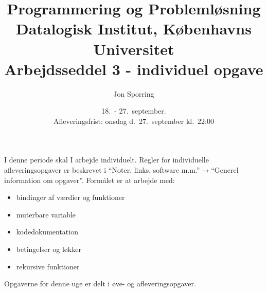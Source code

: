 \documentclass[a4paper,12pt]{article}
\title{Programmering og Problemløsning\\Datalogisk Institut,
  Københavns Universitet\\Arbejdsseddel 3 - individuel opgave}
\author{Jon Sporring}
\date{18.\ - 27.\ september.\\Afleveringsfrist: onsdag d.\ 27.\ september kl.\ 22:00}
\begin{document}
\maketitle

I denne periode skal I arbejde individuelt. Regler for individuelle afleveringsopgaver er beskrevet i "`Noter, links, software m.m."'$\rightarrow$"`Generel information om opgaver"'. Formålet er at arbejde med:
\begin{itemize}
\item bindinger af værdier og funktioner
\item muterbare variable
\item kodedokumentation
\item betingelser og løkker
\item rekursive funktioner
\end{itemize}

Opgaverne for denne uge er delt i øve- og afleveringsopgaver. 
\end{document}
